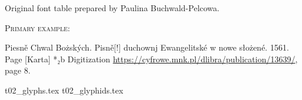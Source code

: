 \documentclass[12pt]{article}
\newcommand{\bg}{\begingl}
\begin{document}
\begin{flushleft}
\noindent
    \label{fig:t01a}

    \medskip

      Original font table prepared by Paulina Buchwald-Pelcowa.

      \bigskip

      \textsc{Primary example:}

      Piesně Chwal Bożských. Pisně[!] duchownj Ewangelitské w nowe słożené.
1561.
      Page [Karta] {\Junicode}*₂b
Digitization %
\url{https://cyfrowe.mnk.pl/dlibra/publication/13639/}, page 8.

 {t02_glyphs.tex}
 {t02_glyphids.tex}


\end{flushleft}

\newpage
\end{document}
